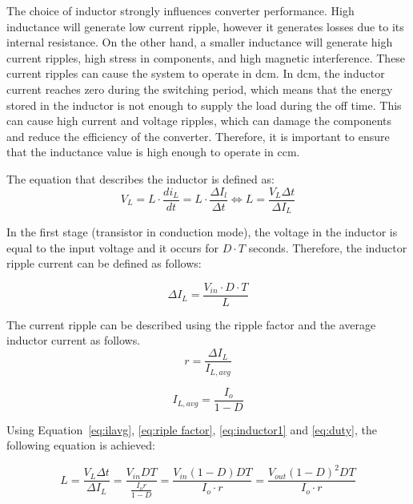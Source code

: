 The choice of inductor strongly influences converter performance. High inductance will generate low current ripple, however it generates losses due to its internal resistance. On the other hand, a smaller inductance will generate high current ripples, high stress in components, and high magnetic interference. These current ripples can cause the system to operate in \ac{dcm}. In \ac{dcm}, the inductor current reaches zero during the switching period, which means that the energy stored in the inductor is not enough to supply the load during the off time. This can cause high current and voltage ripples, which can damage the components and reduce the efficiency of the converter. Therefore, it is important to ensure that the inductance value is high enough to operate in \ac{ccm}.


The equation that describes the inductor is defined as:
\begin{equation}
    V_L = L \cdot \frac{di_L}{dt} = L \cdot \frac{\Delta I_l}{\Delta t} \Leftrightarrow L = \frac{V_L \Delta t}{\Delta I_L}
    \label{eq:inductor1}
\end{equation}

In the first stage (transistor in conduction mode), the voltage in the inductor is equal to the input voltage and it occurs for $D \cdot T$ seconds. Therefore, the inductor ripple current can be defined as follows:

\begin{equation}
    \Delta I_L = \frac{V_{in} \cdot D \cdot T}{L}
\end{equation}

The current ripple can be described using the ripple factor and the average inductor current as follows.
\begin{equation}
    r = \frac{\Delta I_L}{I_{L,avg}}
    \label{eq:riple factor}
\end{equation}

\begin{equation}
    I_{L,avg} = \frac{I_o}{1-D}
    \label{eq:ilavg}
\end{equation}

Using Equation~\ref{eq:ilavg}, \ref{eq:riple factor}, \ref{eq:inductor1} and \ref{eq:duty}, the following equation is achieved:

\begin{equation}
    L = \frac{V_L \Delta t}{\Delta I_L} = \frac{V_{in}DT}{\frac{I_or}{1-D}} = \frac{V_{in} (1-D)DT}{I_o \cdot r} = \frac{V_{out}(1-D)^2DT}{I_o \cdot r}
    \label{eq:L}
\end{equation}

